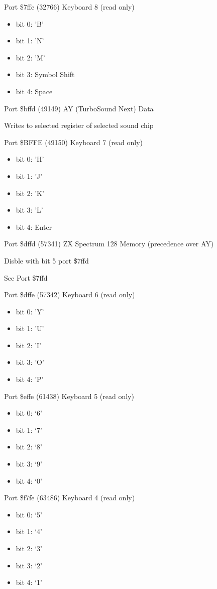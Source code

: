 Port \$7ffe (32766) Keyboard 8 (read only)
\begin{itemize}
\item[] bit 0: 'B'
\item[] bit 1: 'N'
\item[] bit 2: 'M'
\item[] bit 3: Symbol Shift
\item[] bit 4: Space
\end{itemize}

Port \$bffd (49149) AY (TurboSound Next) Data

Writes to selected register of selected sound chip

Port \$BFFE (49150) Keyboard 7 (read only)
\begin{itemize}
\item[] bit 0: 'H'
\item[] bit 1: 'J'
\item[] bit 2: 'K'
\item[] bit 3: 'L'
\item[] bit 4: Enter
\end{itemize}

Port \$dffd (57341) ZX Spectrum 128 Memory (precedence over AY)

Disble with bit 5 port \$7ffd

See Port \$7ffd

Port \$dffe (57342) Keyboard 6 (read only)
\begin{itemize}
\item[] bit 0: 'Y'
\item[] bit 1: 'U'
\item[] bit 2: 'I'
\item[] bit 3: 'O'
\item[] bit 4: 'P'
\end{itemize}

Port \$effe (61438) Keyboard 5 (read only)
\begin{itemize}
\item[] bit 0: ‘6’
\item[] bit 1: ‘7’
\item[] bit 2: ‘8’
\item[] bit 3: ‘9’
\item[] bit 4: ‘0’
\end{itemize}

Port \$f7fe (63486) Keyboard 4 (read only)
\begin{itemize}
\item[] bit 0: ‘5’
\item[] bit 1: ‘4’
\item[] bit 2: ‘3’
\item[] bit 3: ‘2’
\item[] bit 4: ‘1’
\end{itemize}

